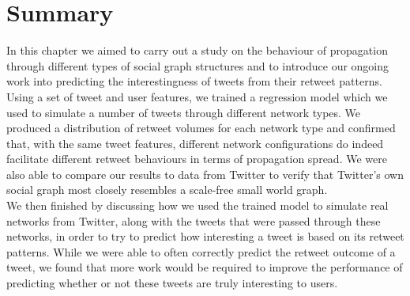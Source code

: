 \section{Summary}
In this chapter we aimed to carry out a study on the behaviour of propagation through different types of social graph structures and to introduce our ongoing work into predicting the interestingness of tweets from their retweet patterns.
\\
Using a set of tweet and user features, we trained a regression model which we used to simulate a number of tweets through different network types. We produced a distribution of retweet volumes for each network type and confirmed that, with the same tweet features, different network configurations do indeed facilitate different retweet behaviours in terms of propagation spread. We were also able to compare our results to data from Twitter to verify that Twitter's own social graph most closely resembles a scale-free small world graph.
\\
We then finished by discussing how we used the trained model to simulate real networks from Twitter, along with the tweets that were passed through these networks, in order to try to predict how interesting a tweet is based on its retweet patterns. While we were able to often correctly predict the retweet outcome of a tweet, we found that more work would be required to improve the performance of predicting whether or not these tweets are truly interesting to users.
